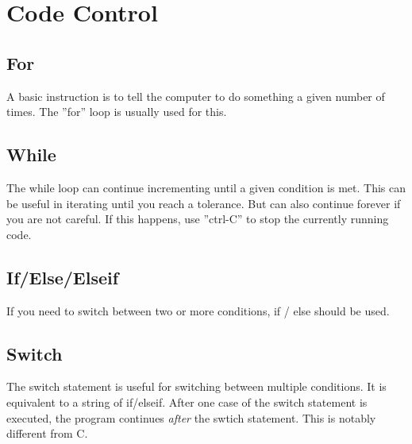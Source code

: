 
\section{Code Control}

\subsection{For}
A basic instruction is to tell the computer to do something a given number of times.
 The ''for'' loop is usually used for this.

\begin{quote}

\end{quote}
\noindent

\pagebreak
\subsection{While}
The while loop can continue incrementing until a given condition is met.
 This can be useful in iterating until you reach a tolerance.
 But can also continue forever if you are not careful.
 If this happens, use ''ctrl-C'' to stop the currently running code.

\begin{quote}

\end{quote}

\pagebreak
\subsection{If/Else/Elseif}
If you need to switch between two or more conditions, if / else should be used.

\begin{quote}

\end{quote}

\pagebreak
\subsection{Switch}
The switch statement is useful for switching between multiple conditions.
 It is equivalent to a string of if/elseif.
 After one case of the switch statement is executed, the program continues \emph{after} the swtich statement.
 This is notably different from C.

\begin{quote}

\end{quote}

